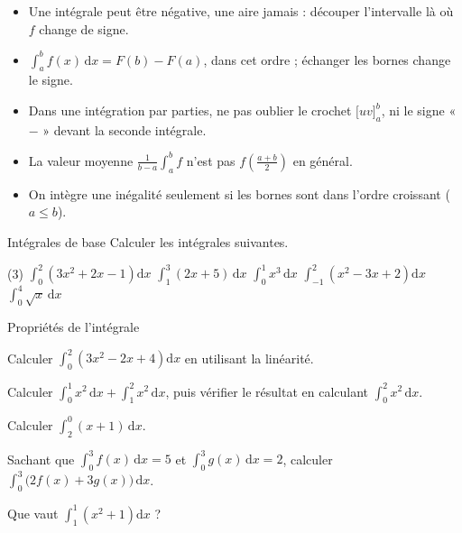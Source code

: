 \begin{attention}
\begin{itemize}[label={\color{otOrange}\textbullet},leftmargin=1.4em,itemsep=0.6mm,topsep=0.5mm]
  \item Une intégrale peut être négative, une aire jamais : découper l'intervalle là où $f$ change de signe.
  \item $\int_a^bf(x)\,\mathrm{d}x=F(b)-F(a)$, dans cet ordre ; échanger les bornes change le signe.
  \item Dans une intégration par parties, ne pas oublier le crochet $\big[uv\big]_a^b$, ni le signe « $-$ » devant la seconde intégrale.
  \item La valeur moyenne $\frac{1}{b-a}\int_a^bf$ n'est pas $f\left(\frac{a+b}{2}\right)$ en général.
  \item On intègre une inégalité seulement si les bornes sont dans l'ordre croissant ($a\leq b$).
\end{itemize}
\end{attention}

\exercices
{}

\begin{exercice}[1]{Intégrales de base}
Calculer les intégrales suivantes.
\begin{tasks}(3)
  \task $\displaystyle\int_0^2\left(3x^{2}+2x-1\right)\mathrm{d}x$
  \task $\displaystyle\int_1^3(2x+5)\,\mathrm{d}x$
  \task $\displaystyle\int_0^1x^{3}\,\mathrm{d}x$
  \task $\displaystyle\int_{-1}^2\left(x^{2}-3x+2\right)\mathrm{d}x$
  \task $\displaystyle\int_0^4\sqrt x\,\mathrm{d}x$
\end{tasks}
\end{exercice}

\begin{exercice}[1]{Propriétés de l'intégrale}
\begin{questions}
  \item Calculer $\displaystyle\int_0^2\left(3x^{2}-2x+4\right)\mathrm{d}x$ en utilisant la linéarité.
  \item Calculer $\displaystyle\int_0^1x^{2}\,\mathrm{d}x+\int_1^2x^{2}\,\mathrm{d}x$, puis vérifier le résultat en calculant $\displaystyle\int_0^2x^{2}\,\mathrm{d}x$.
  \item Calculer $\displaystyle\int_2^0(x+1)\,\mathrm{d}x$.
  \item Sachant que $\displaystyle\int_0^3f(x)\,\mathrm{d}x=5$ et $\displaystyle\int_0^3g(x)\,\mathrm{d}x=2$, calculer $\displaystyle\int_0^3\big(2f(x)+3g(x)\big)\,\mathrm{d}x$.
  \item Que vaut $\displaystyle\int_1^1\left(x^{2}+1\right)\mathrm{d}x$ ?
\end{questions}
\end{exercice}

